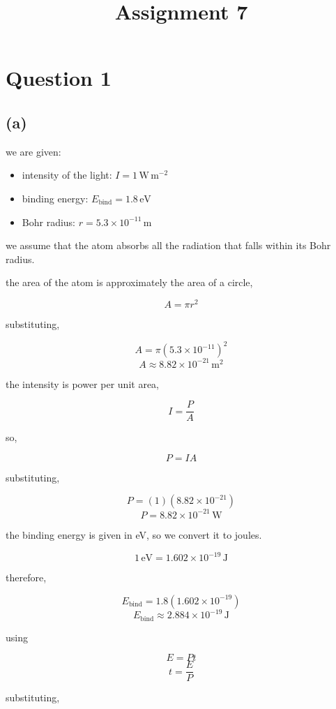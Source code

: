 \documentclass{article}
\title{Assignment 7}
\begin{document}
\maketitle

\section*{Question 1}

\subsection*{(a)}

we are given:

\begin{itemize}
    \item intensity of the light: $I=1\,\mathrm{W\,m^{-2}}$
    \item binding energy: $E_{\mathrm{bind}}=1.8\,\mathrm{eV}$
    \item Bohr radius: $r=5.3\times10^{-11}\,\mathrm{m}$
\end{itemize}

we assume that the atom absorbs all the radiation that falls within its Bohr radius.

the area of the atom is approximately the area of a circle,

\[
A=\pi r^2
\]

substituting,

\[
A=\pi(5.3\times10^{-11})^2
\]
\[
A\approx8.82\times10^{-21}\,\mathrm{m^2}
\]

the intensity is power per unit area,

\[
I=\frac{P}{A}
\]

so,

\[
P=IA
\]

substituting,

\[
P=(1)(8.82\times10^{-21})
\]
\[
P=8.82\times10^{-21}\,\mathrm{W}
\]

the binding energy is given in eV, so we convert it to joules.

\[
1\,\mathrm{eV}=1.602\times10^{-19}\,\mathrm{J}
\]

therefore,

\[
E_{\mathrm{bind}}
=
1.8(1.602\times10^{-19})
\]
\[
E_{\mathrm{bind}}\approx2.884\times10^{-19}\,\mathrm{J}
\]

using

\[
E=Pt
\]
\[
t=\frac{E}{P}
\]

substituting,
\end{document}
